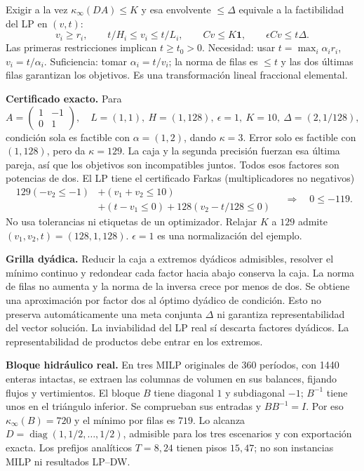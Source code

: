 \documentclass[11pt,a4paper]{article}
\begin{document}
Exigir a la vez $\kappa_\infty(DA)\leq K$ y esa envolvente $\leq\Delta$ equivale
a la factibilidad del LP en $(v,t)$:
\[
 v_i\geq r_i,\qquad t/H_i\leq v_i\leq t/L_i,\qquad
 Cv\leq K\mathbf1,\qquad \epsilon Cv\leq t\Delta.
\]
Las primeras restricciones implican $t\geq t_0>0$. Necesidad: usar
$t=\max_i\alpha_i r_i$, $v_i=t/\alpha_i$. Suficiencia: tomar
$\alpha_i=t/v_i$; la norma de filas es $\leq t$ y las dos últimas filas
garantizan los objetivos. Es una transformación lineal fraccional elemental.

\textbf{Certificado exacto.} Para
\[
 A=\begin{pmatrix}1&-1\\0&1\end{pmatrix},\quad
 L=(1,1),\ H=(1,128),\ \epsilon=1,\ K=10,\ \Delta=(2,1/128),
\]
condición sola es factible con $\alpha=(1,2)$, dando $\kappa=3$.
Error solo es factible con $(1,128)$, pero da $\kappa=129$.
La caja y la segunda precisión fuerzan esa última pareja, así que los objetivos
son incompatibles juntos. Todos esos factores son potencias de dos.
El LP tiene el certificado Farkas (multiplicadores no negativos)
\[
\begin{aligned}
129(-v_2\leq-1)&+(v_1+v_2\leq10)\\
&+(t-v_1\leq0)+128(v_2-t/128\leq0)
\end{aligned}
\quad\Longrightarrow\quad 0\leq-119.
\]
No usa tolerancias ni etiquetas de un optimizador. Relajar $K$ a $129$ admite
$(v_1,v_2,t)=(128,1,128)$. $\epsilon=1$ es una normalización del ejemplo.

\textbf{Grilla dyádica.} Reducir la caja a extremos dyádicos admisibles,
resolver el mínimo continuo y redondear cada factor hacia abajo conserva la
caja. La norma de filas no aumenta y la norma de la inversa crece por menos de
dos. Se obtiene una aproximación por factor dos al óptimo dyádico de condición.
Esto no preserva automáticamente una meta conjunta $\Delta$ ni garantiza
representabilidad del vector solución. La inviabilidad del LP real sí descarta
factores dyádicos. La representabilidad de productos debe entrar en los extremos.

\newpage
\textbf{Bloque hidráulico real.} En tres MILP originales de 360 períodos,
con 1440 enteras intactas, se extraen las columnas de volumen en sus balances,
fijando flujos y vertimientos. El bloque $B$ tiene diagonal $1$ y subdiagonal
$-1$; $B^{-1}$ tiene unos en el triángulo inferior. Se comprueban sus entradas
y $BB^{-1}=I$. Por eso $\kappa_\infty(B)=720$ y el mínimo por filas es $719$.
Lo alcanza $D=\operatorname{diag}(1,1/2,\ldots,1/2)$, admisible para los tres
escenarios y con exportación exacta. Los prefijos analíticos $T=8,24$ tienen
pisos $15,47$; no son instancias MILP ni resultados LP--DW.
\end{document}
